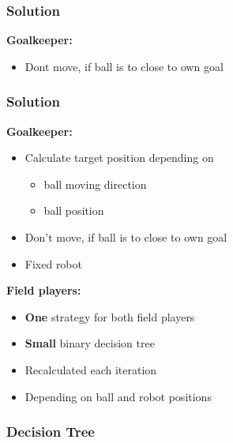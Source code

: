 \documentclass[hyperref={pdfpagelabels=false},compress]{beamer}
\begin{document}
\begin{frame}
		\frametitle{Solution}
		\textbf{Goalkeeper:}\\
		\begin{itemize}
				\item Dont move, if ball is to close to own goal\\
		\end{itemize}
		\begin{center}
				
		\end{center}
\end{frame}

\begin{frame}
    \frametitle{Solution}
    \textbf{Goalkeeper:}\\
    \begin{itemize}
        \item Calculate target position depending on\\
        \begin{itemize}
            \item ball moving direction\\
            \item ball position\\
        \end{itemize}
        \item Don't move, if ball is to close to own goal\\
        \item Fixed robot
    \end{itemize}
    \textbf{Field players:}\\
    \begin{itemize}
        \item \textbf{One} strategy for both field players
        \item \textbf{Small} binary decision tree
        \item Recalculated each iteration
        \item Depending on ball and robot positions
    \end{itemize}
\end{frame}

\begin{frame}
    \frametitle{Decision Tree}
    \begin{center}
        
    \end{center}
\end{frame}
\end{document}
